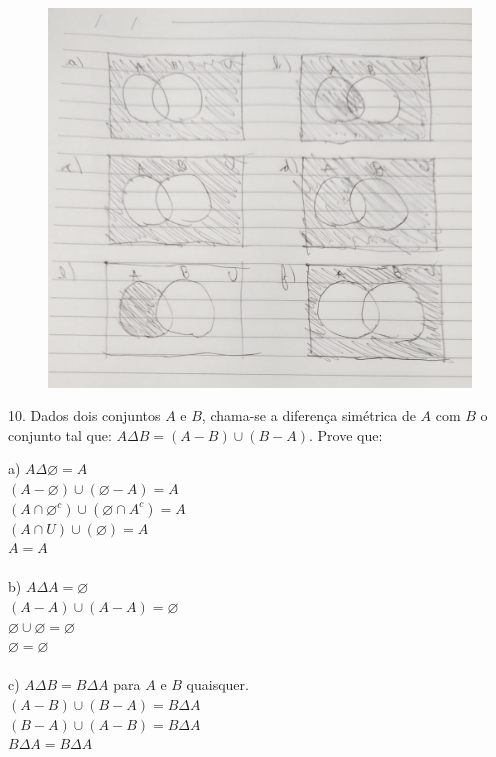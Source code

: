 \documentclass[12pt]{article}
\begin{document}
  	\begin{figure}[h!]
  		\includegraphics[scale=0.2]{q9}
  	\end{figure}
  
  	10. Dados dois conjuntos $A$ e $B$, chama-se a diferença simétrica de $A$ com $B$ o conjunto tal que: $A\Delta B = (A-B)\cup (B-A)$. Prove que:\\
  	\vspace{12pt}	
  	
  	\noindent a) $A\Delta \varnothing = A$\\
  	$(A-\varnothing)\cup(\varnothing-A) = A$\\
  	$(A\cap \varnothing^{c})\cup(\varnothing \cap A^{c}) = A$\\
  	$(A\cap U)\cup(\varnothing) = A$\\
  	$A = A$\\\\
  	
  	\noindent b) $A\Delta A = \varnothing$\\
  	$(A-A)\cup(A-A) = \varnothing$\\
  	$\varnothing \cup \varnothing = \varnothing$\\
  	$\varnothing = \varnothing$\\\\
  	
  	\noindent c) $A\Delta B = B\Delta A$ para $A$ e $B$ quaisquer.\\
  	$(A-B)\cup(B-A) = B\Delta A$\\
  	$(B-A)\cup(A-B) = B\Delta A$\\
  	$B\Delta A = B\Delta A$\\
  	
\end{document}
